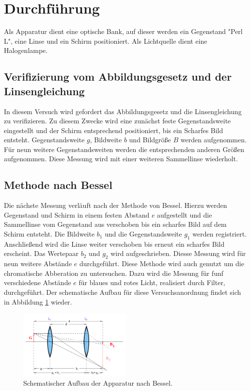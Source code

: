 \section{Durchführung}
\label{sec:Durchführung}
Als Apparatur dient eine optische Bank, auf dieser werden ein Gegenstand "Perl L", eine Linse und ein Schirm
positioniert. Als Lichtquelle dient eine Halogenlampe.
\subsection{Verifizierung vom Abbildungsgesetz und der Linsengleichung}
In diesem Versuch wird gefordert das Abbildungsgesetz und die Linsengleichung zu verifizieren.
Zu diesem Zwecke wird eine zunächst feste Gegenstandsweite eingestellt und der Schirm entsprechend
positioniert, bis ein Scharfes Bild entsteht. Gegenstandsweite $g$, Bildweite $b$ und Bildgröße $B$ werden
aufgenommen. Für neun weitere Gegenstandsweiten werden die entsprechenden anderen Größen aufgenommen.
Diese Messung wird mit einer weiteren Sammellinse wiederholt.
\subsection{Methode nach Bessel}
Die nächste Messung verläuft nach der Methode von Bessel. Hierzu werden Gegenstand und Schirm
in einem festen Abstand $e$ aufgestellt und die Sammellinse vom Gegenstand aus verschoben bis ein scharfes Bild
auf dem Schirm entsteht. Die Bildweite $b_\mathrm{1}$ und die Gegenstandsweite $g_\mathrm{1}$ werden
registriert. Anschließend wird die Linse weiter verschoben bis erneut ein scharfes Bild erscheint.
Das Wertepaar $b_\mathrm{2}$ und $g_\mathrm{2}$ wird aufgeschrieben. Diesse Messung wird für neun
weitere Abstände $e$ durchgeführt.
Diese Methode wird auch genutzt um die chromatische Abberation zu untersuchen. Dazu wird die Messung
für funf verschiedene Abstände $e$ für blaues und rotes Licht, realisiert durch Filter, durchgeführt.
Der schematische Aufbau für diese Versuchsanordnung findet sich in Abbildung \ref{fig:bessel} wieder.
\begin{figure}
 \centering
 \includegraphics[width=0.5\textwidth]{bessel.png}
 \caption{Schematischer Aufbau der Apparatur nach Bessel.\cite{sample}}
 \label{fig:bessel}
 \end{figure}
